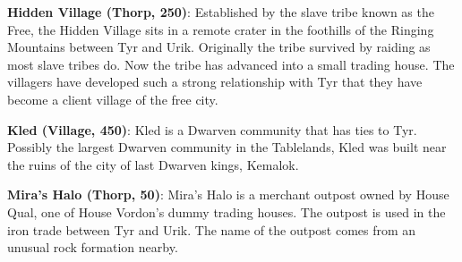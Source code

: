 {
	\textbf{Hidden Village (Thorp, 250)}: Established by the slave tribe known as the Free, the Hidden Village sits in a remote crater in the foothills of the Ringing Mountains between Tyr and Urik. Originally the tribe survived by raiding as most slave tribes do. Now the tribe has advanced into a small trading house. The villagers have developed such a strong relationship with Tyr that they have become a client village of the free city.

	\textbf{Kled (Village, 450)}: Kled is a Dwarven community that has ties to Tyr. Possibly the largest Dwarven community in the Tablelands, Kled was built near the ruins of the city of last Dwarven kings, Kemalok.

	\textbf{Mira's Halo (Thorp, 50)}: Mira's Halo is a merchant outpost owned by House Qual, one of House Vordon's dummy trading houses. The outpost is used in the iron trade between Tyr and Urik. The name of the outpost comes from an unusual rock formation nearby.
}
